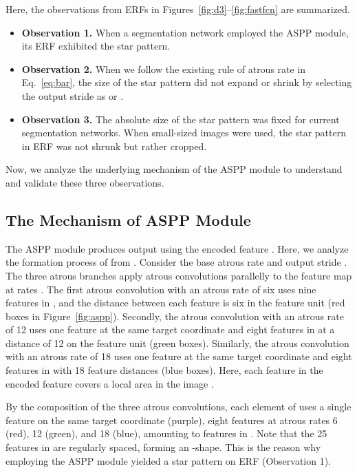 \documentclass{article}
\def\figref#1{Figure~\ref{#1}}
\def\eqref#1{Eq.~\ref{#1}}
\begin{document}
Here, the observations from ERFs in Figures~\ref{fig:d3}--\ref{fig:fastfcn} are summarized.
\begin{itemize}
	\item \textbf{Observation 1.} When a segmentation network employed the ASPP module, its ERF exhibited the star pattern.
	\item \textbf{Observation 2.} When we follow the existing rule of atrous rate in \eqref{eq:bar}, the size of the star pattern did not expand or shrink by selecting the output stride as  or .
	\item \textbf{Observation 3.} The absolute size of the star pattern was fixed for current segmentation networks. When small-sized images were used, the star pattern in ERF was not shrunk but rather cropped.
\end{itemize}

Now, we analyze the underlying mechanism of the ASPP module to understand and validate these three observations.

\subsection{The Mechanism of ASPP Module}
\label{sec:howaspp}

The ASPP module produces output  using the encoded feature . Here, we analyze the formation process of  from . Consider the base atrous rate  and output stride . The three atrous branches apply atrous convolutions parallelly to the feature map  at rates . The first  atrous convolution with an atrous rate of six uses nine features in , and the distance between each feature is six in the feature unit (red boxes in \figref{fig:aspp}). Secondly, the  atrous convolution with an atrous rate of 12 uses one feature at the same target coordinate and eight features in  at a distance of 12 on the feature unit (green boxes). Similarly, the  atrous convolution with an atrous rate of 18 uses one feature at the same target coordinate and eight features in  with 18 feature distances (blue boxes). Here, each feature in the encoded feature  covers a local area in the image .

By the composition of the three atrous convolutions, each element of  uses a single feature on the same target coordinate (purple), eight features at atrous rates 6 (red), 12 (green), and 18 (blue), amounting to  features in . Note that the 25 features in  are regularly spaced, forming an \EightStarTaper-shape. This is the reason why employing the ASPP module yielded a star pattern on ERF (Observation 1).
\end{document}
